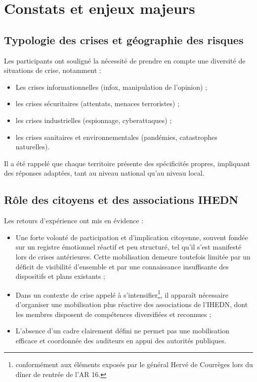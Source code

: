 \documentclass[12pt,a4paper]{article}
\begin{document}
\section{Constats et enjeux majeurs}

\subsection{Typologie des crises et géographie des risques}

Les participants ont souligné la nécessité de prendre en compte une diversité de situations de crise, notamment :

\begin{itemize}
    \item Les crises informationnelles (infox, manipulation de l'opinion) ;
    \item les crises sécuritaires (attentats, menaces terroristes) ;
    \item les crises industrielles (espionnage, cyberattaques) ;
    \item les crises sanitaires et environnementales (pandémies, catastrophes naturelles).
\end{itemize}

Il a été rappelé que chaque territoire présente des spécificités propres, impliquant des réponses adaptées, tant au niveau national qu'au niveau local.

\subsection{Rôle des citoyens et des associations IHEDN}

Les retours d'expérience ont mis en évidence :

\begin{itemize}
    \item Une forte volonté de participation et d'implication citoyenne, souvent fondée sur un registre émotionnel réactif et peu structuré, tel qu'il s'est manifesté lors de crises antérieures. Cette mobilisation demeure toutefois limitée par un déficit de visibilité d'ensemble et par une connaissance insuffisante des dispositifs et plans existants ;
    \item Dans un contexte de crise appelé à s'intensifier\footnote{conformément aux éléments exposés par le général Hervé de Courrèges lors du dîner de rentrée de l'AR 16.}, il apparaît nécessaire d'organiser une mobilisation plus réactive des associations de l'IHEDN, dont les membres disposent de compétences diversifiées et reconnues ;
    \item L'absence d'un cadre clairement défini ne permet pas une mobilisation efficace et coordonnée des auditeurs en appui des autorités publiques.
\end{itemize}
\end{document}
